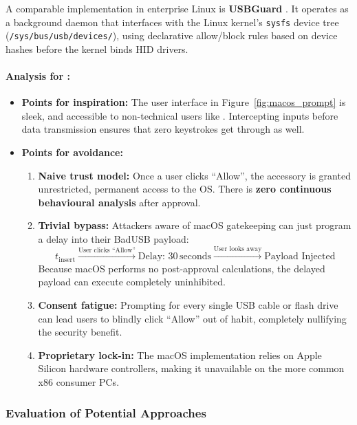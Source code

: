 A comparable implementation in enterprise Linux is \textbf{USBGuard} \cite{usbguardLinux}. It operates as a background daemon that interfaces with the Linux kernel's \texttt{sysfs} device tree (\texttt{/sys/bus/usb/devices/}), using declarative allow/block rules based on device hashes before the kernel binds HID drivers.

\paragraph{Analysis for \projectNameFormatted :}
\begin{itemize}[leftmargin=*, nosep]
	\item \textbf{Points for inspiration:} The user interface in Figure~\ref{fig:macos_prompt} is sleek, and accessible to non-technical users like \stakeholdersTU. Intercepting inputs before data transmission ensures that zero keystrokes get through as well.
	\item \textbf{Points for avoidance:}
	      \begin{enumerate}[leftmargin=*, nosep]
		      \item \textbf{Naive trust model:} Once a user clicks ``Allow'', the accessory is granted unrestricted, permanent access to the OS. There is \textbf{zero continuous behavioural analysis} after approval.
		      \item \textbf{Trivial bypass:} Attackers aware of macOS gatekeeping can just program a delay into their BadUSB payload:
		            \begin{equation}
			            t_{\text{insert}} \xrightarrow{\text{User clicks ``Allow''}} \text{Delay: } 30\,\text{seconds} \xrightarrow{\text{User looks away}} \text{Payload Injected}
		            \end{equation}
		            Because macOS performs no post-approval calculations, the delayed payload can execute completely uninhibited.
		      \item \textbf{Consent fatigue:} Prompting for every single USB cable or flash drive can lead users to blindly click ``Allow'' out of habit, completely nullifying the security benefit.
		      \item \textbf{Proprietary lock-in:} The macOS implementation relies on Apple Silicon hardware controllers, making it unavailable on the more common x86 consumer PCs.
	      \end{enumerate}
\end{itemize}

\subsubsection{Evaluation of Potential Approaches}

